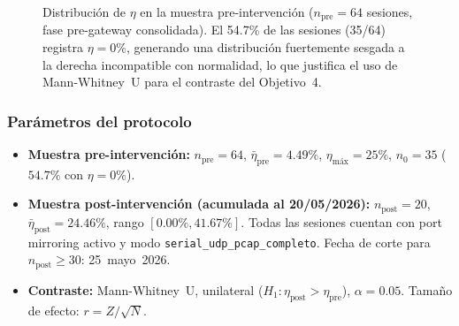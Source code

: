 \begin{figure}[H]
\centering
{}
\caption{Distribución de $\eta$ en la muestra pre-intervención ($n_{\text{pre}}=64$ sesiones, fase pre-gateway consolidada). El 54.7\% de las sesiones (35/64) registra $\eta=0\%$, generando una distribución fuertemente sesgada a la derecha incompatible con normalidad, lo que justifica el uso de Mann-Whitney~U para el contraste del Objetivo~4.}
\label{fig:eta_distribucion}
\end{figure}

\subsubsection*{Parámetros del protocolo}

\begin{itemize}
    \item \textbf{Muestra pre-intervención:} $n_{\text{pre}} = 64$, $\bar{\eta}_{\text{pre}} = 4.49\%$, $\eta_{\text{máx}} = 25\%$, $n_0 = 35$ ($54.7\%$ con $\eta = 0\%$).
    \item \textbf{Muestra post-intervención (acumulada al 20/05/2026):} $n_{\text{post}} = 20$, $\bar{\eta}_{\text{post}} = 24.46\%$, rango $[0.00\%, 41.67\%]$. Todas las sesiones cuentan con port mirroring activo y modo \texttt{serial\_udp\_pcap\_completo}. Fecha de corte para $n_{\text{post}} \geq 30$: 25~mayo~2026.
    \item \textbf{Contraste:} Mann-Whitney~U, unilateral ($H_1: \eta_{\text{post}} > \eta_{\text{pre}}$), $\alpha = 0.05$. Tamaño de efecto: $r = Z/\sqrt{N}$.
\end{itemize}

